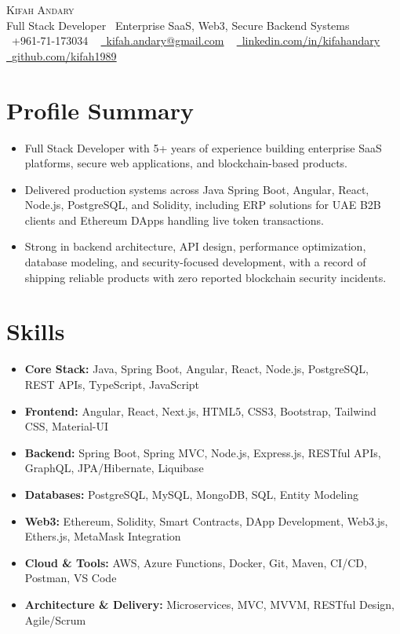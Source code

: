 \documentclass[letterpaper,11pt]{article}
\newcommand{\resumeItem}[1]{
  \item\small{
    {#1 \vspace{-2pt}}
  }
}
\newcommand{\resumeSubHeadingListStart}{\begin{itemize}[leftmargin=0.15in, label={}]}
\newcommand{\resumeSubHeadingListEnd}{\end{itemize}}
\begin{document}
\begin{center}
    {\Huge \scshape Kifah Andary} \\ \vspace{5pt}
  \small Full Stack Developer \textbar\ Enterprise SaaS, Web3, Secure Backend Systems \\ \vspace{4pt}
    \small \raisebox{-0.1\height}\faPhone\ +961-71-173034 ~ \href{mailto:kifah.andary@gmail.com}{\raisebox{-0.1\height}\faEnvelope\  \underline{kifah.andary@gmail.com}} ~ 
    \href{https://www.linkedin.com/in/kifahandary/}{\raisebox{-0.1\height}\faLinkedin\ \underline{linkedin.com/in/kifahandary}} ~
    \href{https://github.com/kifah1989}{\raisebox{-0.1\height}\faGithub\ \underline{github.com/kifah1989}} ~ 
\end{center}


\section{Profile Summary}
\resumeSubHeadingListStart
  \resumeItem{Full Stack Developer with 5+ years of experience building enterprise SaaS platforms, secure web applications, and blockchain-based products.}
  \resumeItem{Delivered production systems across Java Spring Boot, Angular, React, Node.js, PostgreSQL, and Solidity, including ERP solutions for UAE B2B clients and Ethereum DApps handling live token transactions.}
  \resumeItem{Strong in backend architecture, API design, performance optimization, database modeling, and security-focused development, with a record of shipping reliable products with zero reported blockchain security incidents.}
\resumeSubHeadingListEnd


\section{Skills}
\resumeSubHeadingListStart
    \resumeItem{
    \textbf{Core Stack:}{ Java, Spring Boot, Angular, React, Node.js, PostgreSQL, REST APIs, TypeScript, JavaScript}
    }
    \resumeItem{
    \textbf{Frontend:}{ Angular, React, Next.js, HTML5, CSS3, Bootstrap, Tailwind CSS, Material-UI}
    }
    \resumeItem{
    \textbf{Backend:}{ Spring Boot, Spring MVC, Node.js, Express.js, RESTful APIs, GraphQL, JPA/Hibernate, Liquibase}
    }
    \resumeItem{
    \textbf{Databases:}{ PostgreSQL, MySQL, MongoDB, SQL, Entity Modeling}
    }
    \resumeItem{
    \textbf{Web3:}{ Ethereum, Solidity, Smart Contracts, DApp Development, Web3.js, Ethers.js, MetaMask Integration}
    }
    \resumeItem{
    \textbf{Cloud \& Tools:}{ AWS, Azure Functions, Docker, Git, Maven, CI/CD, Postman, VS Code}
    }
    \resumeItem{
    \textbf{Architecture \& Delivery:}{ Microservices, MVC, MVVM, RESTful Design, Agile/Scrum}
    }
\resumeSubHeadingListEnd
\end{document}
